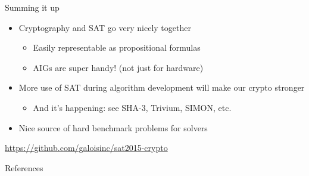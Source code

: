 \documentclass[ignorenonframetext,]{beamer}
\providecommand{\tightlist}{%
  \setlength{\itemsep}{0pt}\setlength{\parskip}{0pt}}
\newcommand{\aurl}[1]{\alert{\url{#1}}}
\begin{document}
\begin{frame}{Summing it up}

\begin{itemize}
\tightlist
\item
  Cryptography and SAT go very nicely together

  \begin{itemize}
  \tightlist
  \item
    Easily representable as propositional formulas
  \item
    AIGs are super handy! (not just for hardware)
  \end{itemize}
\item
  More use of SAT during algorithm development will make our crypto
  stronger

  \begin{itemize}
  \tightlist
  \item
    And it's happening: see SHA-3, Trivium, SIMON, etc.
  \end{itemize}
\item
  Nice source of hard benchmark problems for solvers
\end{itemize}

\begin{center}
\aurl{https://github.com/galoisinc/sat2015-crypto}
\end{center}

\end{frame}

\begin{frame}{References}

\end{frame}
\end{document}
